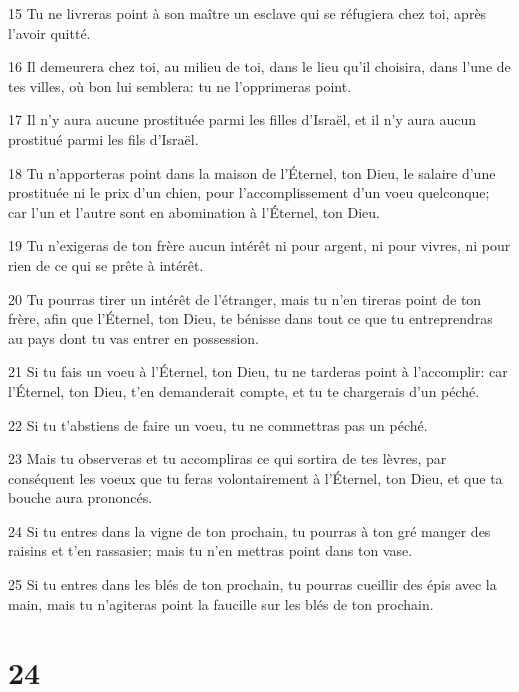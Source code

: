 \par 15 Tu ne livreras point à son maître un esclave qui se réfugiera chez toi, après l'avoir quitté.
\par 16 Il demeurera chez toi, au milieu de toi, dans le lieu qu'il choisira, dans l'une de tes villes, où bon lui semblera: tu ne l'opprimeras point.
\par 17 Il n'y aura aucune prostituée parmi les filles d'Israël, et il n'y aura aucun prostitué parmi les fils d'Israël.
\par 18 Tu n'apporteras point dans la maison de l'Éternel, ton Dieu, le salaire d'une prostituée ni le prix d'un chien, pour l'accomplissement d'un voeu quelconque; car l'un et l'autre sont en abomination à l'Éternel, ton Dieu.
\par 19 Tu n'exigeras de ton frère aucun intérêt ni pour argent, ni pour vivres, ni pour rien de ce qui se prête à intérêt.
\par 20 Tu pourras tirer un intérêt de l'étranger, mais tu n'en tireras point de ton frère, afin que l'Éternel, ton Dieu, te bénisse dans tout ce que tu entreprendras au pays dont tu vas entrer en possession.
\par 21 Si tu fais un voeu à l'Éternel, ton Dieu, tu ne tarderas point à l'accomplir: car l'Éternel, ton Dieu, t'en demanderait compte, et tu te chargerais d'un péché.
\par 22 Si tu t'abstiens de faire un voeu, tu ne commettras pas un péché.
\par 23 Mais tu observeras et tu accompliras ce qui sortira de tes lèvres, par conséquent les voeux que tu feras volontairement à l'Éternel, ton Dieu, et que ta bouche aura prononcés.
\par 24 Si tu entres dans la vigne de ton prochain, tu pourras à ton gré manger des raisins et t'en rassasier; mais tu n'en mettras point dans ton vase.
\par 25 Si tu entres dans les blés de ton prochain, tu pourras cueillir des épis avec la main, mais tu n'agiteras point la faucille sur les blés de ton prochain.

\chapter{24}

